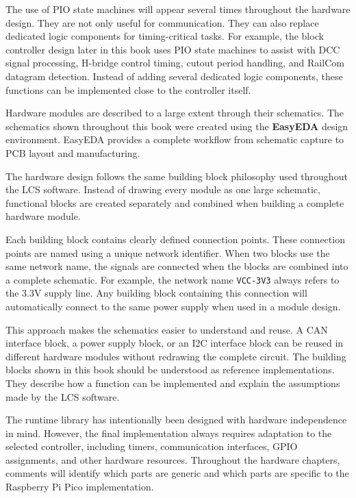 The use of PIO state machines will appear several times throughout the hardware design. They are not 
only useful for communication. They can also replace dedicated logic components for timing-critical 
tasks.
For example, the block controller design later in this book uses PIO state machines to assist with 
DCC signal processing, H-bridge control timing, cutout period handling, and RailCom datagram 
detection. Instead of adding several dedicated logic components, these functions can be implemented 
close to the controller itself.


Hardware modules are described to a large extent through their schematics. The schematics shown 
throughout this book were created using the \textbf{EasyEDA} design environment. EasyEDA provides a 
complete workflow from schematic capture to PCB layout and manufacturing.

The hardware design follows the same building block philosophy used throughout the LCS software. 
Instead of drawing every module as one large schematic, functional blocks are created separately and 
combined when building a complete hardware module.

Each building block contains clearly defined connection points. These connection points are named 
using a unique network identifier. When two blocks use the same network name, the signals are 
connected when the blocks are combined into a complete schematic.
For example, the network name \texttt{VCC-3V3} always refers to the 3.3V supply line. Any building 
block containing this connection will automatically connect to the same power supply when used in a 
module design.

This approach makes the schematics easier to understand and reuse. A CAN interface block, a power 
supply block, or an I2C interface block can be reused in different hardware modules without 
redrawing the complete circuit.
The building blocks shown in this book should be understood as reference implementations. They 
describe how a function can be implemented and explain the assumptions made by the LCS software.

The runtime library has intentionally been designed with hardware independence in mind. However, the 
final implementation always requires adaptation to the selected controller, including timers, 
communication interfaces, GPIO assignments, and other hardware resources.
Throughout the hardware chapters, comments will identify which parts are generic and which parts are 
specific to the Raspberry Pi Pico implementation.


